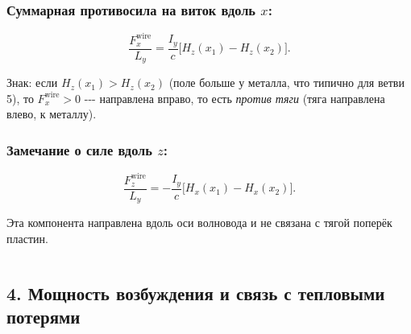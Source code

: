 \documentclass[11pt]{article}
\makeatletter
\newcommand{\boxspacing}{\kern\kvtcb@left@rule\kern\kvtcb@boxsep}
\newcommand{\prompt}[4]{
        {\ttfamily\llap{{\color{#2}[#3]:\hspace{3pt}#4}}\vspace{-\baselineskip}}
    }
\makeatother
\begin{document}
\subsubsection{\texorpdfstring{Суммарная противосила на виток вдоль
\(x\):}{Суммарная противосила на виток вдоль x:}}\label{ux441ux443ux43cux43cux430ux440ux43dux430ux44f-ux43fux440ux43eux442ux438ux432ux43eux441ux438ux43bux430-ux43dux430-ux432ux438ux442ux43eux43a-ux432ux434ux43eux43bux44c-x}

\begin{equation}
    \boxed{
        \frac{F_x^{\mathrm{wire}}}{L_y}
        = \frac{I_y}{c}\bigl[H_z(x_1) - H_z(x_2)\bigr].
    }
    \label{eq:F_wire}
\end{equation}

Знак: если \(H_z(x_1) > H_z(x_2)\) (поле больше у металла, что типично
для ветви 5), то \(F_x^{\mathrm{wire}} > 0\) -\/-\/- направлена вправо,
то есть \emph{против тяги} (тяга направлена влево, к металлу).

\subsubsection{\texorpdfstring{Замечание о силе вдоль
\(z\):}{Замечание о силе вдоль z:}}\label{ux437ux430ux43cux435ux447ux430ux43dux438ux435-ux43e-ux441ux438ux43bux435-ux432ux434ux43eux43bux44c-z}

\begin{equation*}
    \frac{F_z^{\mathrm{wire}}}{L_y}
    = -\frac{I_y}{c}\bigl[H_x(x_1) - H_x(x_2)\bigr].
\end{equation*}

Эта компонента направлена вдоль оси волновода и не связана с тягой
поперёк пластин.

    \begin{tcolorbox}[breakable, size=fbox, boxrule=1pt, pad at break*=1mm,colback=cellbackground, colframe=cellborder]
\prompt{In}{incolor}{ }{\boxspacing}
\begin{Verbatim}[commandchars=\\\{\}]

\end{Verbatim}
\end{tcolorbox}

    \subsection{4. Мощность возбуждения и связь с тепловыми
потерями}\label{ux43cux43eux449ux43dux43eux441ux442ux44c-ux432ux43eux437ux431ux443ux436ux434ux435ux43dux438ux44f-ux438-ux441ux432ux44fux437ux44c-ux441-ux442ux435ux43fux43bux43eux432ux44bux43cux438-ux43fux43eux442ux435ux440ux44fux43cux438}
\end{document}
